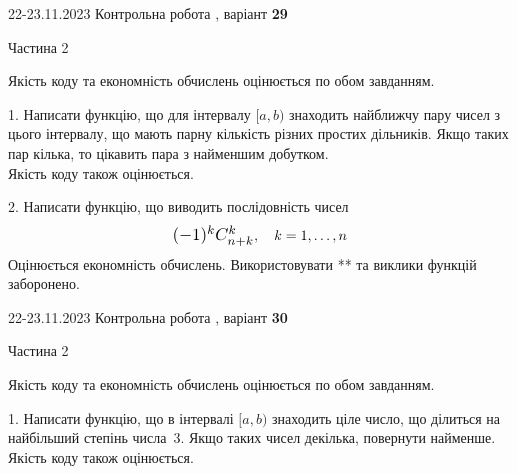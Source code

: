 \documentclass[12pt, ukrainian]{article}
\begin{document}
\begin {Huge}
{{22-23.11.2023 Контрольна робота , варіант  \No \textbf { 29 }\par}}

\begin{center}Частина 2
\end{center}
\vspace{10mm}
\end {Huge}

{
\begin {Large}
Якість коду та економність обчислень оцінюється по обом завданням.

\vspace{5mm}

1. Написати функцію, що для інтервалу $[a, b)$ знаходить найближчу пару чисел з цього інтервалу, що мають парну кількість різних простих дільників. Якщо таких пар кілька, то цікавить пара з найменшим добутком.\\	Якість коду також оцінюється. 



\vspace{10mm}



2. 
Написати функцію, що виводить послідовність чисел
$$\scalebox{1.2}{$(-1)^{k}C_{n+k}^{k}$}, \quad k=1,\ldots,n$$
Оцінюється економність обчислень. Використовувати ** та виклики функцій заборонено.

\end{Large}\newpage




\begin {Huge}
{{22-23.11.2023 Контрольна робота , варіант  \No \textbf { 30 }\par}}

\begin{center}Частина 2
\end{center}
\vspace{10mm}
\end {Huge}

{
\begin {Large}
Якість коду та економність обчислень оцінюється по обом завданням.

\vspace{5mm}

1. Написати функцію, що в інтервалі $[a, b)$ знаходить ціле число, що ділиться на найбільший степінь числа 3. Якщо таких чисел декілька, повернути найменше.\\	Якість коду також оцінюється. 




\end{Large}}}
\end{document}
